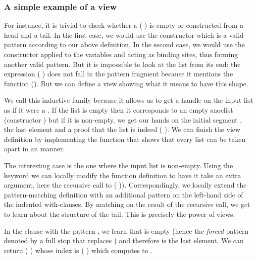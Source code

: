 
\subsubsection{A simple example of a view}

For instance, it is trivial to check whether a ( )
is empty or constructed from a head and a tail.
%
In the first case, we would use the constructor  which is a valid
pattern according to our above definition.
%
In the second case, we would use the constructor \IdrisData{(::)} applied to the
variables  and  acting as binding sites, thus
forming another valid pattern.
%
But it is impossible to look at the list from its end: the expression
( \IdrisFunction{++} \IdrisData{[}\IdrisData{]})
does not fall in the pattern fragment because it mentions the function (\IdrisFunction{++}).
But we can define a view showing what it means to have this shape.


We call this inductive family  because it allows us to get
a handle on the input list as if it were a . If the list is
empty then it corresponds to an empty snoclist (constructor )
but if it is non-empty, we get our hands on the initial segment ,
the last element  and a proof that the list is indeed
( \IdrisFunction{++} \IdrisData{[}\IdrisData{]}).
%
We can finish the view definition by implementing the function 
that shows that every list  can be taken apart in an 
manner.


The interesting case is the one where the input list is non-empty.
%
Using the  keyword we can locally modify the function
definition to have it take an extra argument, here the recursive call to
( )).
%
Correspondingly, we locally extend the pattern-matching definition with
an additional pattern on the left-hand side of the indented with-clauses.
%
By matching on the result of the recursive call, we get to learn about the
structure of the tail. This is precisely the power of views.

In the clause with the pattern \IdrisData{[<]}, we learn that  is empty
(hence the \emph{forced} pattern denoted by a full stop
\IdrisData{[]}\IdrisKeyword{)} that replaces )
and therefore  is the last element.
%
We can return (\IdrisData{[]} \IdrisData{:<} ) whose index is
(\IdrisData{[]} \IdrisFunction{++} \IdrisData{[}\IdrisData{]})
which computes to \IdrisData{[}\IdrisData{]}.

